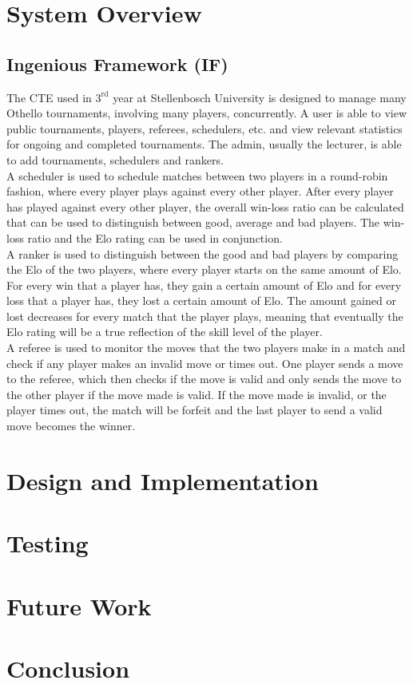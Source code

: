 \documentclass[a4paper, 12pt]{report}
\begin{document}
\chapter{System Overview}

\section{Ingenious Framework (IF)}

The CTE used in $3^{\text{rd}}$ year at Stellenbosch
University is \mbox{designed} to manage many Othello \cite{othello} tournaments,
involving many players, concurrently. A user is able to view public tournaments,
players, referees, schedulers, etc. and view \mbox{relevant} statistics for
ongoing and completed tournaments. The admin, usually the \mbox{lecturer}, is
able to add tournaments, schedulers and rankers. \\

A scheduler is used to schedule matches between two players in a round-robin
\mbox{fashion}, where every player plays against every other player. After every player
has played against every other player, the overall win-loss ratio can be calculated
that can be used to \mbox{distinguish} between good, average and bad players. The
win-loss ratio and the Elo rating \cite{elo} can be used in conjunction. \\

A ranker is used to distinguish between the good and bad players by comparing
the Elo of the two players, where every player starts on the same amount of Elo.
For every win that a player has, they gain a certain amount of Elo and for every
loss that a player has, they lost a certain amount of Elo. The amount gained or
lost decreases for every match that the player plays, meaning that eventually
the Elo rating will be a true reflection of the skill level of the player. \\

A referee is used to monitor the moves that the two players make in a match and
check if any player makes an invalid move or times out. One player sends a
move to the referee, which then checks if the move is valid and only sends
the move to the other player if the move made is valid. If the move made is
invalid, or the player times out, the match will be forfeit and the last player
to send a valid move becomes the winner.

\chapter{Design and Implementation}

\chapter{Testing}

\chapter{Future Work}

\chapter{Conclusion}

\printbibliography
\end{document}
